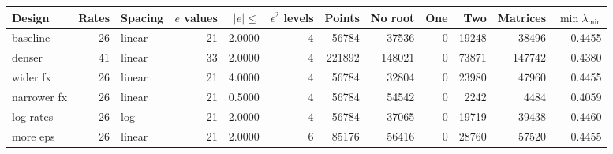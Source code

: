 \begin{tabular}{lrlrrrrrrrrr}
\toprule
Design & Rates & Spacing & $e$ values & $|e|\le$ & $\epsilon^2$ levels & Points & No root & One & Two & Matrices & $\min\lambda_{\min}$ \\
\midrule
baseline & 26 & linear & 21 & 2.0000 & 4 & 56784 & 37536 & 0 & 19248 & 38496 & 0.4455 \\
denser & 41 & linear & 33 & 2.0000 & 4 & 221892 & 148021 & 0 & 73871 & 147742 & 0.4380 \\
wider fx & 26 & linear & 21 & 4.0000 & 4 & 56784 & 32804 & 0 & 23980 & 47960 & 0.4455 \\
narrower fx & 26 & linear & 21 & 0.5000 & 4 & 56784 & 54542 & 0 & 2242 & 4484 & 0.4059 \\
log rates & 26 & log & 21 & 2.0000 & 4 & 56784 & 37065 & 0 & 19719 & 39438 & 0.4460 \\
more eps & 26 & linear & 21 & 2.0000 & 6 & 85176 & 56416 & 0 & 28760 & 57520 & 0.4455 \\
\bottomrule
\end{tabular}
